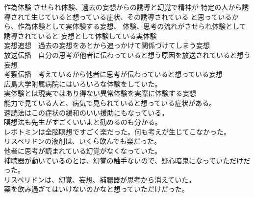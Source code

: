\documentclass{jsarticle}
\begin{document}
\title{}
\author{}
\date{}
\maketitle




作為体験  させられ体験、過去の妄想からの誘導と幻覚で精神が
特定の人から誘導されて生じていると想っている症状、その誘導されている
と思っているから、作為体験として実体験する妄想、
体験、思考の流れがさせられ体験として誘導されていると
妄想として体験している実体験\\
妄想追想　過去の妄想をあとから追っかけて関係づけてしまう妄想\\ 
放送伝播　自分の思考が他者に伝わっていると想う原因を放送されていると想う妄想\\ 
考察伝播　考えているから他者に思考が伝わっていると想っている妄想\\ 
広島大学附属病院にはいろいろな体験をしていた。\\
実体験とは現実ではあり得ない異常体験を実際に体験する妄想\\ 
能力で見ている人と、病気で見られていると想っている症状がある。\\ 
速読法はこの症状の緩和のいい援助にもなっている。\\ 
瞑想法も先生がすごくいいよと勧めるのも分かる。 \\ 
レボトミンは全脳瞑想ですごく楽だった。何も考えが生じてこなかった。\\
リスペリドンの液剤は、いくら飲んでも楽だった。\\
他者に思考が読まれている幻覚がなくなっていた。\\ 
補聴器が動いているのとは、幻覚の触手ないので、疑心暗鬼になっていただけだった。\\ 
リスペリドンは、幻覚、妄想、補聴器が思考から消えていた。\\ 
薬を飲み過ぎてはいけないのかなと想っていただけだった。\\
\end{document}
